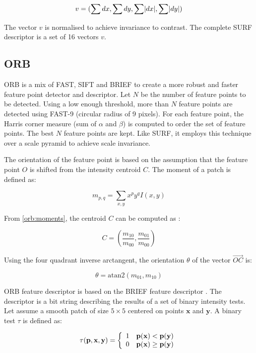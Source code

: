 \documentclass[11pt]{report}
\begin{document}
\[
v = (\sum{dx}, \sum{dy}, \sum{\abs{dx}}, \sum{\abs{dy}})
\]

The vector $v$ is normalised to achieve invariance to contrast. The complete SURF descriptor is a set of 16 vectors $v$.

\subsection{ORB}

ORB\cite{Orb11} is a mix of FAST, SIFT and BRIEF to create a more robust and faster feature point detector and descriptor. Let $N$ be the number of feature points to be detected. Using a low enough threshold, more than $N$ feature points are detected using FAST-9 (circular radius of 9 pixels). For each feature point, the Harris corner measure (sum of $\alpha$ and $\beta$) is computed to order the set of feature points. The best $N$ feature points are kept. Like SURF, it employs this technique over a scale pyramid to achieve scale invariance.

The orientation of the feature point is based on the assumption that the feature point $O$ is shifted from the intensity centroid $C$. The moment of a patch is defined as:

\begin{equation}
  \label{orb:moments}
  m_{p,q} = \sum_{x,y} x^py^q I(x,y)
\end{equation}

From \ref{orb:moments}, the centroid $C$ can be computed as :

\[
  C = \left ( \frac{m_{10}}{m_{00}}, \frac{m_{01}}{m_{00}} \right )
\]

Using the four quadrant inverse arctangent, the orientation $\theta$ of the vector $\overrightarrow{OC}$ is:

\[
  \theta = \text{atan2}(m_{01}, m_{10})
\]

ORB feature descriptor is based on the BRIEF feature descriptor \cite{Brief10}. The descriptor is a bit string describing the results of a set of binary intensity tests. Let assume a smooth patch of size $5\times 5$ centered on points $\mathbf{x}$ and $\mathbf{y}$. A binary test $\tau$ is defined as:

\[
  \tau (\mathbf{p}, \mathbf{x}, \mathbf{y}) =   
\left \{
  \begin{array}{l l}
    1 & \mathbf{p}(\mathbf{x}) < \mathbf{p}(\mathbf{y}) \\
    0 & \mathbf{p}(\mathbf{x}) \geq \mathbf{p}(\mathbf{y}) \\
  \end{array}
  \right .
\]
\end{document}
